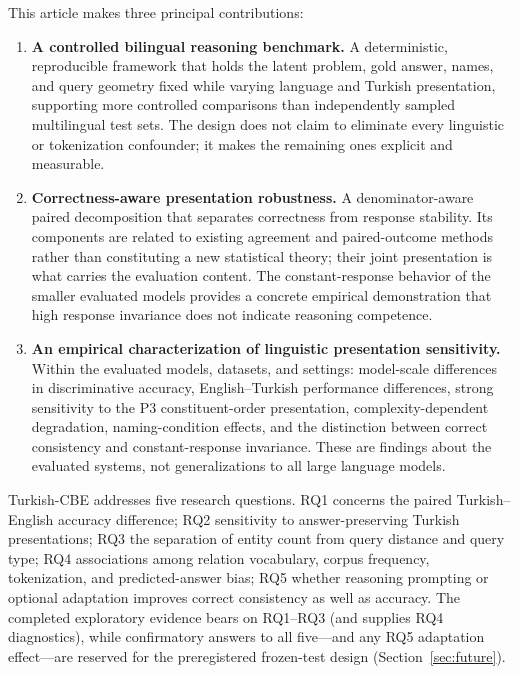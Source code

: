 This article makes three principal contributions:
\begin{enumerate}[leftmargin=1.6em]
  \item \textbf{A controlled bilingual reasoning benchmark.} A deterministic, reproducible framework that
  holds the latent problem, gold answer, names, and query geometry fixed while varying language and Turkish
  presentation, supporting more controlled comparisons than independently sampled multilingual test sets.
  The design does not claim to eliminate every linguistic or tokenization confounder; it makes the remaining
  ones explicit and measurable.
  \item \textbf{Correctness-aware presentation robustness.} A denominator-aware paired decomposition that
  separates correctness from response stability. Its components are related to existing agreement and
  paired-outcome methods rather than constituting a new statistical theory; their joint presentation is what
  carries the evaluation content. The constant-response behavior of the smaller evaluated models provides a
  concrete empirical demonstration that high response invariance does not indicate reasoning competence.
  \item \textbf{An empirical characterization of linguistic presentation sensitivity.} Within the evaluated
  models, datasets, and settings: model-scale differences in discriminative accuracy, English--Turkish
  performance differences, strong sensitivity to the P3 constituent-order presentation, complexity-dependent
  degradation, naming-condition effects, and the distinction between correct consistency and
  constant-response invariance. These are findings about the evaluated systems, not generalizations to all
  large language models.
\end{enumerate}

Turkish-CBE addresses five research questions. RQ1 concerns the paired Turkish--English accuracy
difference; RQ2 sensitivity to answer-preserving Turkish presentations; RQ3 the separation of entity count
from query distance and query type; RQ4 associations among relation vocabulary, corpus frequency,
tokenization, and predicted-answer bias; RQ5 whether reasoning prompting or optional adaptation improves
correct consistency as well as accuracy. The completed exploratory evidence bears on RQ1--RQ3 (and supplies
RQ4 diagnostics), while confirmatory answers to all five---and any RQ5 adaptation effect---are reserved for
the preregistered frozen-test design (Section~\ref{sec:future}).
